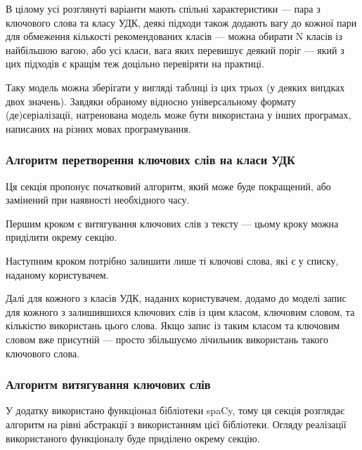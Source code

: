 \documentclass[14pt]{extarticle}
\begin{document}
  В цілому усі розглянуті варіанти мають спільні характеристики ---
  пара з ключового слова та класу УДК,
  деякі підходи також додають вагу до кожної пари для обмеження кількості
  рекомендованих класів --- можна обирати N класів із найбільшою вагою,
  або усі класи, вага яких перевишує деякий поріг ---
  який з цих підходів є кращім теж доцільно перевіряти на практиці.

  Таку модель можна зберігати у вигляді таблиці із цих трьох
  (у деяких випдках двох значень).
  Завдяки обраному відносно універсальному формату (де)серіалізації,
  натренована модель може бути використана у інших програмах,
  написаних на різних мовах програмування.

  \subsubsection{Алгоритм перетворення ключових слів на класи УДК}
  Ця секція пропонує початковий алгоритм, який може буде покращений,
  або замінений при наявності необхідного часу.

  Першим кроком є витягування ключових слів з тексту ---
  цьому кроку можна приділити окрему секцію.

  Наступним кроком потрібно залишити лише ті ключові слова, які є у списку,
  наданому користувачем.

  Далі для кожного з класів УДК, наданих користувачем,
  додамо до моделі запис для кожного з залишившихся ключових слів із цим класом,
  ключовим словом, та кількістю використань цього слова.
  Якщо запис із таким класом та ключовим словом вже присутній ---
  просто збільшуємо лічильник використань такого ключового слова.

  \subsubsection{Алгоритм витягування ключових слів}
  У додатку використано функціонал бібліотеки spaCy,
  тому ця секція розглядає алгоритм \cite{wiki_algorithm} на рівні абстракції
  \cite{wiki_abstraction,wiki_abstraction_layer}
  з використанням цієї бібліотеки.
  Огляду реалізації використаного функціоналу буде приділено окрему секцію.
\end{document}
